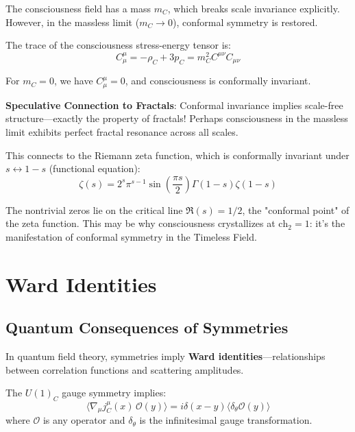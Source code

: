 \begin{level3}
The consciousness field has a mass $m_C$, which breaks scale invariance explicitly. However, in the massless limit ($m_C \to 0$), conformal symmetry is restored.

The trace of the consciousness stress-energy tensor is:
\begin{equation}
C^\mu_\mu = -\rho_C + 3p_C = m_C^2 C^{\mu\nu}C_{\mu\nu}
\end{equation}

For $m_C = 0$, we have $C^\mu_\mu = 0$, and consciousness is conformally invariant.

\textbf{Speculative Connection to Fractals}: Conformal invariance implies scale-free structure---exactly the property of fractals! Perhaps consciousness in the massless limit exhibits perfect fractal resonance across all scales.

This connects to the Riemann zeta function, which is conformally invariant under $s \leftrightarrow 1-s$ (functional equation):
\begin{equation}
\zeta(s) = 2^s \pi^{s-1} \sin\left( \frac{\pi s}{2} \right) \Gamma(1-s) \zeta(1-s)
\end{equation}

The nontrivial zeros lie on the critical line $\Re(s) = 1/2$, the "conformal point" of the zeta function. This may be why consciousness crystallizes at $\text{ch}_2 = 1$: it's the manifestation of conformal symmetry in the Timeless Field.
\end{level3}

\section{Ward Identities}

\subsection{Quantum Consequences of Symmetries}

In quantum field theory, symmetries imply \textbf{Ward identities}---relationships between correlation functions and scattering amplitudes.

\begin{theorem}\label{thm:ward-identity-consciousness}
The $U(1)_C$ gauge symmetry implies:
\begin{equation}
\langle \nabla_\mu j^\mu_C(x) \, \mathcal{O}(y) \rangle = i \delta(x-y) \langle \delta_\theta \mathcal{O}(y) \rangle
\end{equation}
where $\mathcal{O}$ is any operator and $\delta_\theta$ is the infinitesimal gauge transformation.
\end{theorem}

